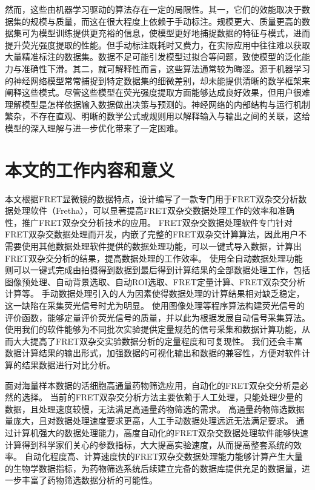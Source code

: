 然而，这些由机器学习驱动的算法存在一定的局限性。其一，它们的效能取决于数据集的规模与质量，而这在很大程度上依赖于手动标注。规模更大、质量更高的数据集可为模型训练提供更充裕的信息，使模型更好地捕捉数据的特征与模式，进而提升荧光强度提取的性能。但手动标注既耗时又费力，在实际应用中往往难以获取大量精准标注的数据集。数据不足可能引发模型过拟合等问题，致使模型的泛化能力与准确性下滑。其二，就可解释性而言，这些算法通常较为晦涩。源于机器学习的神经网络模型常常捕捉到特定数据集的细微差别，却未能提供清晰的数学框架来阐释这些模式。尽管这些模型在荧光强度提取方面能够达成良好效果，但用户很难理解模型是怎样依据输入数据做出决策与预测的。神经网络的内部结构与运行机制繁杂，不存在直观、明晰的数学公式或规则用以解释输入与输出之间的关联，这给模型的深入理解与进一步优化带来了一定困难。
\fi

\section{本文的工作内容和意义}

\ifshowtext
本文根据FRET显微镜的数据特点，设计编写了一款专门用于FRET双杂交分析数据处理软件（Fretha），可以显著提高FRET双杂交数据处理工作的效率和准确性，推广FRET双杂交分析技术的应用。
FRET双杂交数据处理软件专门针对FRET双杂交数据处理而开发，内嵌了完整的FRET双杂交计算算法，因此用户不需要使用其他数据处理软件提供的数据处理功能，可以一键式导入数据，计算出FRET双杂交分析的结果，提高数据处理的工作效率。
使用全自动数据处理功能则可以一键式完成由拍摄得到数据到最后得到计算结果的全部数据处理工作，包括图像预处理、自动背景选取、自动ROI选取、FRET定量计算、FRET双杂交分析计算等。
手动数据处理引入的人为因素使得数据处理的计算结果相对缺乏稳定，这一缺陷在采集荧光信号时尤为明显。
使用图像处理等程序算法构建荧光信号的评价函数，能够定量评价荧光信号的质量，并以此为根据发展自动信号采集算法。
使用我们的软件能够为不同批次实验提供定量规范的信号采集和数据计算功能，从而大大提高了FRET双杂交实验数据分析的定量程度和可复现性。
我们还会丰富数据计算结果的输出形式，加强数据的可视化输出和数据的兼容性，方便对软件计算的结果数据进行对比分析。

面对海量样本数据的活细胞高通量药物筛选应用，自动化的FRET双杂交分析是必然的选择。
当前的FRET双杂交分析方法主要依赖于人工处理，只能处理少量的数据，且处理速度较慢，无法满足高通量药物筛选的需求。
高通量药物筛选数据量庞大，且对数据处理速度要求更高，人工手动数据处理远远无法满足要求。
通过计算机强大的数据处理能力，高度自动化的FRET双杂交数据处理软件能够快速计算得到科学家们关心的参数指标，大大提高实验速度，从而提高整套系统的效率。
自动化程度高、计算速度快的FRET双杂交数据处理能力能够计算产生大量的生物学数据指标，为药物筛选系统后续建立完备的数据库提供充足的数据量，进一步丰富了药物筛选数据分析的可能性。

